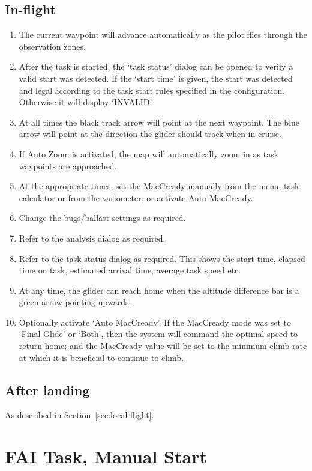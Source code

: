 \documentclass[a4paper,12pt]{refrep}
\begin{document}
\subsection*{In-flight}
\begin{enumerate}
\item The current waypoint will advance automatically as the pilot flies through the observation zones.  
\item After the task is started, the `task status' dialog can be opened to verify a valid start was detected.  If the `start time' is given, the start was detected and legal according to the task start rules specified in the configuration.  Otherwise it will display `INVALID'.
\item At all times the black track arrow will point at the next waypoint.  The blue arrow will point at the direction the glider should track when in cruise.
\item If Auto Zoom is activated, the map will automatically zoom in as task
  waypoints are approached.
\item At the appropriate times, set the MacCready manually from the menu,
  task calculator or from the variometer; or activate Auto MacCready.
\item Change the bugs/ballast settings as required.
\item Refer to the analysis dialog as required. 
\item Refer to the task status dialog as required.  This shows the start time,
  elapsed time on task, estimated arrival time, average task speed etc.
\item At any time, the glider can reach home when the altitude difference
  bar is a green arrow pointing upwards.
\item Optionally activate `Auto MacCready'.
If the MacCready mode was set to `Final Glide' or `Both', then the
system will command the optimal speed to return home; and the
MacCready value will be set to the minimum climb rate at which it is
beneficial to continue to climb.
\end{enumerate}

\subsection*{After landing}
As described in Section~\ref{sec:local-flight}.

\section{FAI Task, Manual Start}\label{sec:fai-task2}
\end{document}
